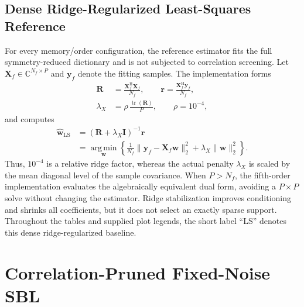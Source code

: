 \documentclass[conference]{IEEEtran}
\newcommand{\mat}[1]{\mathbf{#1}}
\newcommand{\herm}{\mathrm{H}}
\newcommand{\argmin}{\operatorname*{arg\,min}}
\begin{document}
\subsection{Dense Ridge-Regularized Least-Squares Reference}
For every memory/order configuration, the reference estimator fits the full symmetry-reduced dictionary and is not subjected to correlation screening.
Let $\mat X_f\in\mathbb C^{N_f\times P}$ and $\mat y_f$ denote the fitting samples. The implementation forms
\begin{align}
 \mat R&=\frac{\mat X_f^{\herm}\mat X_f}{N_f},\qquad
 \mat r=\frac{\mat X_f^{\herm}\mat y_f}{N_f}, \label{eq:ls-stats}\\
 \lambda_X&=\rho\,\frac{\operatorname{tr}(\mat R)}{P},\qquad
 \rho=10^{-4}, \label{eq:ls-lambda}
\end{align}
and computes
\begin{equation}
\begin{split}
 \widehat{\mat w}_{\mathrm{LS}}
 &=\left(\mat R+\lambda_X\mat I\right)^{-1}\mat r\\
 &=\argmin_{\mat w}\left\{
 \frac{1}{N_f}\|\mat y_f-\mat X_f\mat w\|_2^2
 +\lambda_X\|\mat w\|_2^2\right\}.
\end{split}
\label{eq:ls}
\end{equation}
Thus, $10^{-4}$ is a relative ridge factor, whereas the actual penalty $\lambda_X$ is scaled by the mean diagonal level of the sample covariance. %
When $P>N_f$, the fifth-order implementation evaluates the algebraically equivalent dual form, avoiding a $P\times P$ solve without changing the estimator.
Ridge stabilization improves conditioning and shrinks all coefficients, but it does not select an exactly sparse support. Throughout the tables and supplied plot legends, the short label ``LS'' denotes this dense ridge-regularized baseline.

\section{Correlation-Pruned Fixed-Noise SBL}
\label{sec:method}
\end{document}
